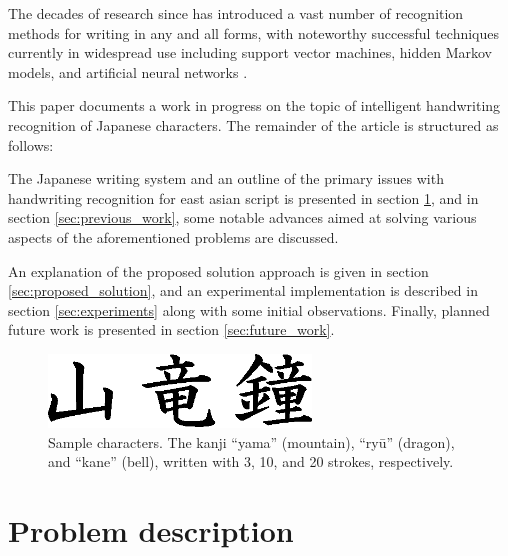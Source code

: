 \documentclass[10pt,conference,a4paper]{IEEEtran}
\begin{document}
	The decades of research since has introduced a vast number of recognition methods for writing in any and all forms, with noteworthy successful techniques
	currently in widespread use including support vector machines, hidden Markov models, and artificial neural networks \cite{fujisawa2008forty, tappert1990state}.

	This paper documents a work in progress on the topic of intelligent handwriting recognition of Japanese characters.
	The remainder of the article is structured as follows:

	The Japanese writing system and an outline of the primary issues with handwriting recognition for east asian script is presented in section \ref{sec:problem_description}, and
	in section \ref{sec:previous_work}, some notable advances aimed at solving various aspects of the aforementioned problems are discussed.

	An explanation of the proposed solution approach is given in section \ref{sec:proposed_solution}, and an experimental implementation is described in section \ref{sec:experiments}
	along with some initial observations. Finally, planned future work is presented in section \ref{sec:future_work}.

	
	\begin{figure}
		\centering
		\includegraphics[width=2.75in]{./fig/yama-ryuu-kane.eps}
		\caption{Sample characters. The kanji ``yama'' (mountain), ``ry\=u'' (dragon), and ``kane'' (bell), written with 3, 10, and 20 strokes, respectively.}
		\label{fig_kanji_sample}
	\end{figure}



	\section{Problem description}
	\label{sec:problem_description}
\end{document}
